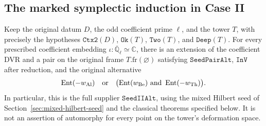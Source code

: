 \subsection{The marked symplectic induction in Case II}
\label{sec:rh-symplectic-induction}

\begin{theorem}
\label{thm:rh-seed-II-alt}
Keep the original datum \(D\), the odd coefficient prime \(\ell\),
and the tower \(T\), with precisely the hypotheses
\(\texttt{Ctx2}(D)\), \(\texttt{Ok}(T)\), \(\texttt{Two}(T)\), and
\(\texttt{Deep}(T)\). For every prescribed coefficient embedding
\(\iota:\overline{\mathbb Q}_{\ell}\simeq\mathbb C\), there is an
extension of the coefficient DVR and a pair on the original frame
\(T.\mathrm{fr}(\varnothing)\) satisfying \(\texttt{SeedPairAlt}\),
\(\texttt{InV}\) after reduction, and the original alternative
\[
 \operatorname{Ent}(-w_{\rm Al})\quad\text{or}\quad
 \bigl(\operatorname{Ent}(w_{\rm Be})\ \text{and}\
       \operatorname{Ent}(-w_{\rm Th})\bigr).
\]
In particular, this is the full supplier \(\texttt{SeedIIAlt}\), using
the mixed Hilbert seed of Section~\ref{sec:mixed-hilbert-seed} and
the classical theorems specified below. It is not an assertion of
automorphy for every point on the tower's deformation space.
\end{theorem}

